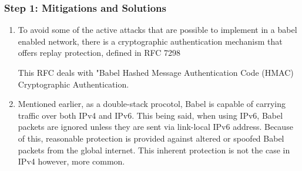 \documentclass[main.tex]{subfiles}
\begin{document}
\begin{itemize}
\subsubsection{Step 1: Mitigations and Solutions } 
\begin{enumerate}[noitemsep,label=$\bullet$,leftmargin=20mm,labelsep=0.5cm]

\item To avoid some of the active attacks that are possible to implement in a babel enabled network, there is a cryptographic authentication mechanism that offers replay protection, defined in RFC 7298 %

This RFC deals with "Babel Hashed Message Authentication Code (HMAC) Cryptographic Authentication.

\item Mentioned earlier, as a double-stack procotol, Babel is capable of carrying traffic over both IPv4 and IPv6. This being said, when using IPv6, Babel packets are ignored unless they are sent via link-local IPv6 address. Because of this, reasonable protection is provided against altered or spoofed Babel packets from the global internet. This inherent protection is not the case in IPv4 however, more common. 

\end{enumerate}

     
\end{itemize}
\end{document}

